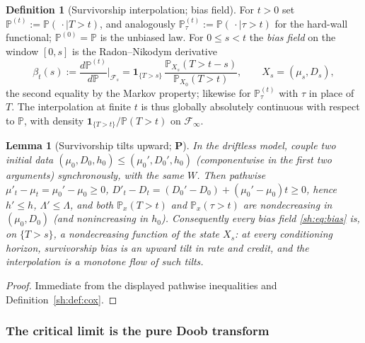 \documentclass[11pt]{article}
\numberwithin{equation}{section}
\theoremstyle{plain}
\newtheorem{lemma}[theorem]{Lemma}
\theoremstyle{definition}
\newtheorem{definition}[theorem]{Definition}
\theoremstyle{remark}
\newcommand{\PP}{\mathbb{P}}
\newcommand{\one}{\mathbf{1}}
\newcommand{\Fc}{\mathcal{F}}
\begin{document}
\begin{definition}[Survivorship interpolation; bias field]
\label{sh:def:interp}
For $t>0$ set $\PP^{(t)}:=\PP(\,\cdot\mid T>t)$, and analogously
$\PP^{(t)}_\tau:=\PP(\,\cdot\mid\tau>t)$ for the hard-wall functional;
$\PP^{(0)}=\PP$ is the unbiased law. For $0\le s<t$ the \emph{bias field}
on the window $[0,s]$ is the Radon--Nikodym derivative
\begin{equation}\label{sh:eq:bias}
\beta_t(s):=\frac{d\PP^{(t)}}{d\PP}\Big|_{\Fc_s}
=\one_{\{T>s\}}\,
\frac{\PP_{X_s}(T>t-s)}{\PP_{X_0}(T>t)},
\qquad X_s=(\mu_s,D_s),
\end{equation}
the second equality by the Markov property; likewise for
$\PP^{(t)}_\tau$ with $\tau$ in place of $T$. The interpolation at finite
$t$ is thus globally absolutely continuous with respect to $\PP$, with
density $\one_{\{T>t\}}/\PP(T>t)$ on $\Fc_\infty$.
\end{definition}

\begin{lemma}[Survivorship tilts upward; \textbf{P}]\label{sh:lem:monotone}
In the driftless model, couple two initial data
$(\mu_0,D_0,h_0)\le(\mu_0',D_0',h_0)$ (componentwise in the first two
arguments) synchronously, with the same $W$. Then pathwise
$\mu'_t-\mu_t=\mu_0'-\mu_0\ge0$,
$D'_t-D_t=(D_0'-D_0)+(\mu_0'-\mu_0)t\ge0$, hence $h'\le h$,
$\Lambda'\le\Lambda$, and both $\PP_x(T>t)$ and $\PP_x(\tau>t)$ are
nondecreasing in $(\mu_0,D_0)$ (and nonincreasing in $h_0$). Consequently
every bias field \eqref{sh:eq:bias} is, on $\{T>s\}$, a nondecreasing
function of the state $X_s$: at every conditioning horizon, survivorship
bias is an upward tilt in rate and credit, and the interpolation is a
monotone flow of such tilts.
\end{lemma}

\begin{proof}
Immediate from the displayed pathwise inequalities and
Definition~\ref{sh:def:cox}.
\end{proof}

\subsubsection{The critical limit is the pure Doob transform}
\label{sh:subsub:Q}
\end{document}
